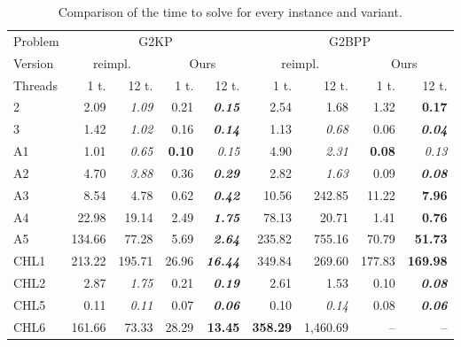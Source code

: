 \documentclass[9pt]{entcs}
\begin{document}
\begin{table}[ht]
\caption{Comparison of the time to solve for every instance and variant.}
\begin{tabular}{@{\extracolsep{4pt}}lrrrrrrrr@{}}
\hline\hline
Problem & \multicolumn{4}{c}{G2KP} & \multicolumn{4}{c}{G2BPP}\\\cline{2-5}\cline{6-9}
Version & \multicolumn{2}{c}{\cite{furini:2016} reimpl.} & \multicolumn{2}{c}{Ours} & \multicolumn{2}{c}{\cite{furini:2016} reimpl.} & \multicolumn{2}{c}{Ours}\\\cline{2-3}\cline{4-5}\cline{6-7}\cline{8-9}
Threads & 1 t. & 12 t. & 1 t. & 12 t. & 1 t. & 12 t. & 1 t. & 12 t. \\\hline
2 & 2.09 & \textit{1.09} & 0.21 & \textbf{\textit{0.15}} & 2.54 & 1.68 & 1.32 & \textbf{0.17} \\
3 & 1.42 & \textit{1.02} & 0.16 & \textbf{\textit{0.14}} & 1.13 & \textit{0.68} & 0.06 & \textbf{\textit{0.04}} \\
A1 & 1.01 & \textit{0.65} & \textbf{0.10} & \textit{0.15} & 4.90 & \textit{2.31} & \textbf{0.08} & \textit{0.13} \\
A2 & 4.70 & \textit{3.88} & 0.36 & \textbf{\textit{0.29}} & 2.82 & \textit{1.63} & 0.09 & \textbf{\textit{0.08}} \\
A3 & 8.54 & 4.78 & 0.62 & \textbf{\textit{0.42}} & 10.56 & 242.85 & 11.22 & \textbf{7.96} \\
A4 & 22.98 & 19.14 & 2.49 & \textbf{\textit{1.75}} & 78.13 & 20.71 & 1.41 & \textbf{0.76} \\
A5 & 134.66 & 77.28 & 5.69 & \textbf{\textit{2.64}} & 235.82 & 755.16 & 70.79 & \textbf{51.73} \\
CHL1 & 213.22 & 195.71 & 26.96 & \textbf{\textit{16.44}} & 349.84 & 269.60 & 177.83 & \textbf{169.98} \\
CHL2 & 2.87 & \textit{1.75} & 0.21 & \textbf{\textit{0.19}} & 2.61 & 1.53 & 0.10 & \textbf{\textit{0.08}} \\
CHL5 & 0.11 & \textit{0.11} & 0.07 & \textbf{\textit{0.06}} & 0.10 & \textit{0.14} & 0.08 & \textbf{\textit{0.06}} \\
CHL6 & 161.66 & 73.33 & 28.29 & \textbf{13.45} & \textbf{358.29} & 1,460.69 & -- & -- \\

\end{tabular}
\end{table}
\end{document}
